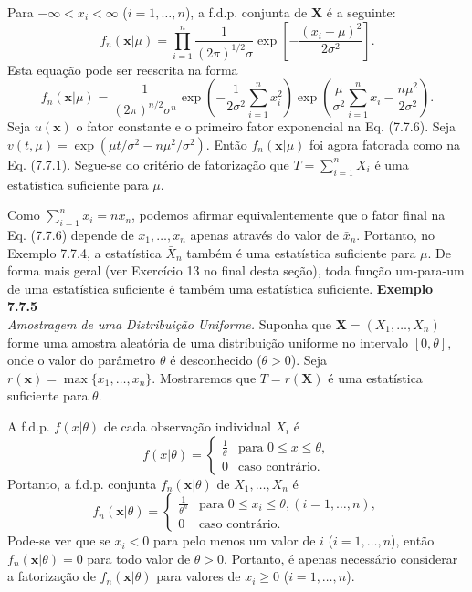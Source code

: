 Para $-\infty < x_i < \infty$ ($i=1, \dots, n$), a f.d.p. conjunta de $\mathbf{X}$ é a seguinte:
\begin{equation}
f_n(\mathbf{x}|\mu) = \prod_{i=1}^{n} \frac{1}{(2\pi)^{1/2}\sigma} \exp\left[ -\frac{(x_i - \mu)^2}{2\sigma^2} \right]. \tag{7.7.5}
\end{equation}
Esta equação pode ser reescrita na forma
\begin{equation}
f_n(\mathbf{x}|\mu) = \frac{1}{(2\pi)^{n/2}\sigma^n} \exp\left(-\frac{1}{2\sigma^2}\sum_{i=1}^{n} x_i^2\right) \exp\left(\frac{\mu}{\sigma^2}\sum_{i=1}^{n} x_i - \frac{n\mu^2}{2\sigma^2}\right). \tag{7.7.6}
\end{equation}
Seja $u(\mathbf{x})$ o fator constante e o primeiro fator exponencial na Eq. (7.7.6). Seja $v(t, \mu) = \exp(\mu t / \sigma^2 - n\mu^2/\sigma^2)$. Então $f_n(\mathbf{x}|\mu)$ foi agora fatorada como na Eq. (7.7.1). Segue-se do critério de fatorização que $T = \sum_{i=1}^{n} X_i$ é uma estatística suficiente para $\mu$.

Como $\sum_{i=1}^{n} x_i = n\bar{x}_n$, podemos afirmar equivalentemente que o fator final na Eq. (7.7.6) depende de $x_1, \dots, x_n$ apenas através do valor de $\bar{x}_n$. Portanto, no Exemplo 7.7.4, a estatística $\bar{X}_n$ também é uma estatística suficiente para $\mu$. De forma mais geral (ver Exercício 13 no final desta seção), toda função um-para-um de uma estatística suficiente é também uma estatística suficiente.
\noindent\textbf{Exemplo 7.7.5} \\
\textit{Amostragem de uma Distribuição Uniforme.} Suponha que $\mathbf{X}=(X_1, \dots, X_n)$ forme uma amostra aleatória de uma distribuição uniforme no intervalo $[0, \theta]$, onde o valor do parâmetro $\theta$ é desconhecido ($\theta > 0$). Seja $r(\mathbf{x}) = \max\{x_1, \dots, x_n\}$. Mostraremos que $T=r(\mathbf{X})$ é uma estatística suficiente para $\theta$.

A f.d.p. $f(x|\theta)$ de cada observação individual $X_i$ é
\[ f(x|\theta) = 
\begin{cases} 
\frac{1}{\theta} & \text{para } 0 \le x \le \theta, \\ 
0 & \text{caso contrário.} 
\end{cases} \]
Portanto, a f.d.p. conjunta $f_n(\mathbf{x}|\theta)$ de $X_1, \dots, X_n$ é
\[ f_n(\mathbf{x}|\theta) = 
\begin{cases} 
\frac{1}{\theta^n} & \text{para } 0 \le x_i \le \theta, (i=1, \dots, n), \\ 
0 & \text{caso contrário.} 
\end{cases} \]
Pode-se ver que se $x_i < 0$ para pelo menos um valor de $i$ ($i=1, \dots, n$), então $f_n(\mathbf{x}|\theta) = 0$ para todo valor de $\theta > 0$. Portanto, é apenas necessário considerar a fatorização de $f_n(\mathbf{x}|\theta)$ para valores de $x_i \ge 0$ ($i=1, \dots, n$).


